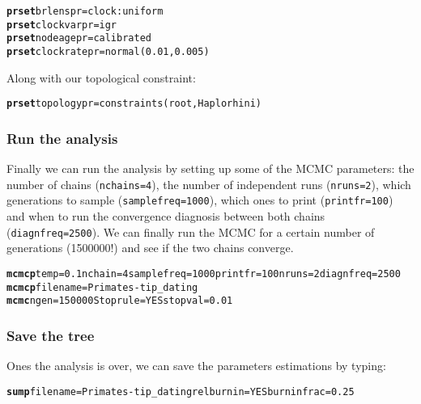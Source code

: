 \documentclass{article}\usepackage[]{graphicx}\usepackage[]{color}
\makeatletter
\newcommand{\hlstr}[1]{\textcolor[rgb]{0.192,0.494,0.8}{#1}}%
\newcommand{\hlkwd}[1]{\textcolor[rgb]{0.737,0.353,0.396}{\textbf{#1}}}%
\newenvironment{kframe}{%
 \def\at@end@of@kframe{}%
 \ifinner\ifhmode%
  \def\at@end@of@kframe{\end{minipage}}%
  \begin{minipage}{\columnwidth}%
 \fi\fi%
 \def\FrameCommand##1{\hskip\@totalleftmargin \hskip-\fboxsep
 \colorbox{shadecolor}{##1}\hskip-\fboxsep
     \hskip-\linewidth \hskip-\@totalleftmargin \hskip\columnwidth}%
 \MakeFramed {\advance\hsize-\width
   \@totalleftmargin\z@ \linewidth\hsize
   \@setminipage}}%
 {\par\unskip\endMakeFramed%
 \at@end@of@kframe}
\newenvironment{knitrout}{}{} %
\makeatother
\begin{document}
\begin{knitrout}
\color{fgcolor}\begin{kframe}
\begin{alltt}
\hlkwd{prset} brlenspr=\hlstr{clock:uniform}
\hlkwd{prset} clockvarpr=\hlstr{igr}
\hlkwd{prset} nodeagepr=\hlstr{calibrated}
\hlkwd{prset} clockratepr=\hlstr{normal(0.01,0.005)}
\end{alltt}
\end{kframe}
\end{knitrout}
\noindent Along with our topological constraint:
\begin{knitrout}
\color{fgcolor}\begin{kframe}
\begin{alltt}
\hlkwd{prset} topologypr=\hlstr{constraints(root, Haplorhini)}
\end{alltt}
\end{kframe}
\end{knitrout}

\subsubsection{Run the analysis}
Finally we can run the analysis by setting up some of the MCMC parameters: the number of chains (\texttt{nchains=4}), the number of independent runs (\texttt{nruns=2}), which generations to sample (\texttt{samplefreq=1000}), which ones to print (\texttt{printfr=100}) and when to run the convergence diagnosis between both chains (\texttt{diagnfreq=2500}).
We can finally run the MCMC for a certain number of generations (1500000!) and see if the two chains converge.
\begin{knitrout}
\color{fgcolor}\begin{kframe}
\begin{alltt}
\hlkwd{mcmcp} temp=\hlstr{0.1} nchain=\hlstr{4} samplefreq=\hlstr{1000} printfr=\hlstr{100} nruns=\hlstr{2} diagnfreq=\hlstr{2500}
\hlkwd{mcmcp} filename=\hlstr{Primates-tip_dating}
\hlkwd{mcmc} ngen=\hlstr{150000} Stoprule=\hlstr{YES} stopval=\hlstr{0.01}
\end{alltt}
\end{kframe}
\end{knitrout}

\subsubsection{Save the tree}
Ones the analysis is over, we can save the parameters estimations by typing:
\begin{knitrout}
\color{fgcolor}\begin{kframe}
\begin{alltt}
\hlkwd{sump} filename=\hlstr{Primates-tip_dating} relburnin=\hlstr{YES} burninfrac=\hlstr{0.25}
\end{alltt}
\end{kframe}
\end{knitrout}
\end{document}

